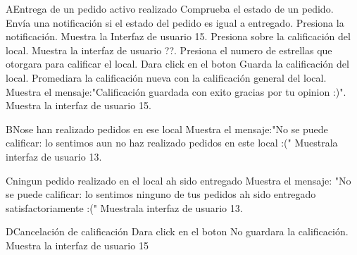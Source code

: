 	\begin{UCtrayectoriaA}{A}{Entrega de un pedido activo realizado}
		\UCpaso Comprueba el estado de un pedido.
		\UCpaso Envía una notificación si el estado del pedido es igual a entregado.
		\UCpaso[\UCactor]Presiona la notificación.
		\UCpaso Muestra la Interfaz de usuario 15.%
		\UCpaso[\UCactor] Presiona sobre la calificación del local.
		\UCpaso Muestra la interfaz de usuario ??.%
		\UCpaso[\UCactor]Presiona el numero de estrellas que otorgara para calificar el local.
		\UCpaso[\UCactor] Dara click en el boton 
		\UCpaso Guarda la calificación del local.
		\UCpaso Promediara la calificación nueva con la calificación general del local.
		\UCpaso Muestra el mensaje:"Calificación guardada con exito gracias por tu opinion :)".%
		\UCpaso Muestra la interfaz de usuario 15.
	\end{UCtrayectoriaA}

	\begin{UCtrayectoriaA}{B}{Nose han realizado pedidos en ese local}
		\UCpaso Muestra el mensaje:"No se puede calificar: lo sentimos aun no haz realizado pedidos en este local :("
		\UCpaso Muestrala interfaz de usuario 13.
	\end{UCtrayectoriaA}

	\begin{UCtrayectoriaA}{C}{ningun pedido realizado en el local ah sido entregado}
		\UCpaso Muestra el mensaje: "No se puede calificar: lo sentimos ninguno de tus pedidos ah sido entregado satisfactoriamente :("
		\UCpaso Muestrala interfaz de usuario 13.
	\end{UCtrayectoriaA}

	\begin{UCtrayectoriaA}{D}{Cancelación de calificación}
		\UCpaso[\UCactor]Dara click en el boton 
		\UCpaso No guardara la calificación.
		\UCpaso Muestra la interfaz de usuario 15
	\end{UCtrayectoriaA}